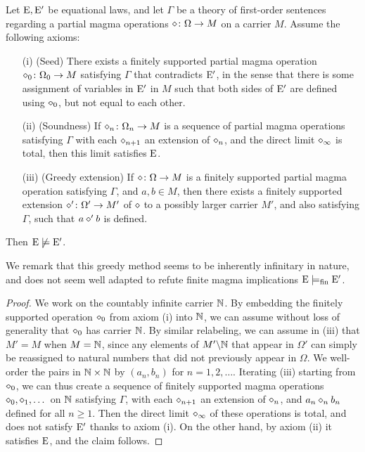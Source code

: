 \begin{theorem}\label{greedy-abstract} Let $\mathrm{E},{\mathrm{E}'}$ be equational laws, and let $\Gamma$ be a theory of first-order sentences regarding a  partial magma operations $\diamond \colon \Omega \to M$ on a carrier $M$.  Assume the following axioms:
\begin{itemize}
  \item[(i)] (Seed) There exists a finitely supported partial magma operation $\diamond_0 \colon \Omega_0 \to M$ satisfying $\Gamma$ that contradicts ${\mathrm{E}'}$, in the sense that there is some assignment of variables in ${\mathrm{E}'}$ in $M$ such that both sides of ${\mathrm{E}'}$ are defined using $\diamond_0$, but not equal to each other.
  \item[(ii)]  (Soundness)  If $\diamond_n \colon \Omega_n \to M$ is a sequence of partial magma operations satisfying $\Gamma$ with each $\diamond_{n+1}$ an extension of $\diamond_n$, and the direct limit $\diamond_\infty$ is total, then this limit satisfies $\mathrm{E}$.
  \item[(iii)] (Greedy extension)  If $\diamond \colon \Omega \to M$ is a finitely supported partial magma operation satisfying $\Gamma$, and $a,b \in M$, then there exists a finitely supported extension $\diamond' \colon \Omega' \to M'$ of $\diamond$ to a possibly larger carrier $M'$, and also satisfying $\Gamma$, such that $a \diamond' b$ is defined.
\end{itemize}
Then $\mathrm{E} \not\models {\mathrm{E}'}$.
\end{theorem}

We remark that this greedy method seems to be inherently infinitary in nature, and does not seem well adapted to refute finite magma implications $\mathrm{E} \models_{\mathrm{fin}} {\mathrm{E}'}$.

\begin{proof}  We work on the countably infinite carrier $\mathbb{N}$.  By embedding the finitely supported operation $\diamond_0$ from axiom (i) into $\mathbb{N}$, we can assume without loss of generality that $\diamond_0$ has carrier $\mathbb{N}$.  By similar relabeling, we can assume in (iii) that $M' = M$ when $M=\mathbb{N}$, since any elements of $M' \backslash \mathbb{N}$ that
appear in $\Omega'$ can simply be reassigned to natural numbers that did not previously appear in $\Omega$.  We well-order the pairs in $\mathbb{N} \times \mathbb{N}$ by $(a_n,b_n)$ for $n=1,2,\dots$.  Iterating (iii) starting from $\diamond_0$, we can thus create a sequence of finitely supported magma operations $\diamond_0, \diamond_1, \dots$ on $\mathbb{N}$ satisfying $\Gamma$, with each $\diamond_{n+1}$ an extension of $\diamond_n$, and $a_n \diamond_n b_n$ defined for all $n \geq 1$.  Then the direct limit $\diamond_\infty$ of these operations is total, and does not satisfy ${\mathrm{E}'}$ thanks to axiom (i).  On the other hand, by axiom (ii) it satisfies $\mathrm{E}$, and the claim follows.
\end{proof}

